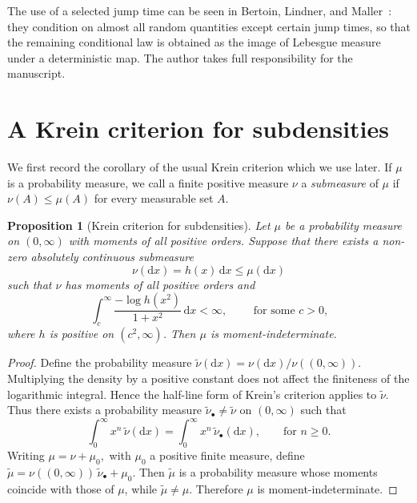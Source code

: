 \documentclass[10pt,a4paper]{amsart}
\newtheorem{proposition}[theorem]{Proposition}
\newcommand{\1}{\mathbf 1}
\newcommand{\dd}{\mathrm d}
\begin{document}
The use of a selected jump time can be seen in Bertoin, Lindner, and Maller~\cite[Section 3.3]{Bertoin-Lindner-Maller-2008}: they condition on almost all random quantities except certain jump times, so that the remaining conditional law is obtained as the image of Lebesgue measure under a deterministic map. The author takes full responsibility for the manuscript.

\section{A Krein criterion for subdensities}

    We first record the corollary of the usual Krein criterion which we use later. If $\mu$ is a probability measure, we call a finite positive measure $\nu$  a \textit{submeasure} of $\mu$ if $\nu(A)\leq\mu(A)$ for every measurable set $A$.

\begin{proposition}[Krein criterion for subdensities]\label{prop:subkrein}
Let $\mu$ be a probability measure on $(0,\infty)$ with moments of all positive orders. Suppose that there exists a non-zero absolutely continuous submeasure
\[
 \nu(\dd x)=h(x)\,\dd x\leq \mu(\dd x)
\]
such that $\nu$ has moments of all positive orders and
\begin{equation}\label{eq:krein}
 \int_c^\infty \frac{-\log h(x^2)}{1+x^2}\,\dd x<\infty,
 \qquad
 \text{ for some $c>0$,}
\end{equation}
where $h$ is positive on $(c^2,\infty)$. Then $\mu$ is moment-indeterminate.
\end{proposition}

\begin{proof}
Define the probability measure
$
 \widetilde\nu(\dd x)=\nu(\dd x)/\nu((0,\infty)).
$
Multiplying the density by a positive constant does not affect the finiteness of the logarithmic integral. Hence the half-line form of Krein's criterion \cite[Theorem~4]{Lin-2017} applies to $\widetilde\nu$. Thus there exists a probability measure $\widetilde\nu_\bullet\ne\widetilde\nu$ on $(0,\infty)$ such that
\[
 \int_0^\infty x^n\,\widetilde\nu(\dd x)
 =
 \int_0^\infty x^n\,\widetilde\nu_\bullet(\dd x),
 \qquad
 \text{for }n\geq0.
\]
Writing
$
 \mu=\nu+\mu_0,
$
with $\mu_0$ a positive finite measure, define
$ \widetilde\mu=\nu((0,\infty))\,\widetilde\nu_\bullet+\mu_0.
$
Then $\widetilde\mu$ is a probability measure whose moments coincide with those of $\mu$, while $\widetilde\mu\ne\mu$. Therefore $\mu$ is moment-indeterminate.
\end{proof}
\end{document}
